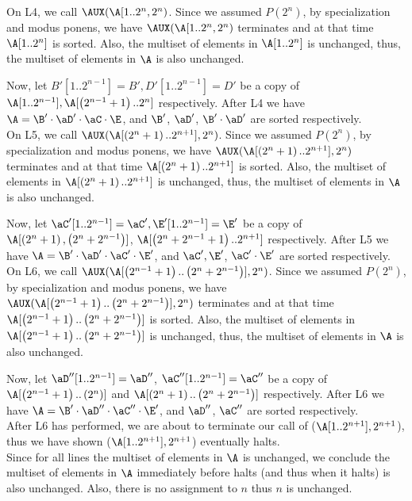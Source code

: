 \documentclass[11pt, sakura, night, 1in]{hw}
\begin{document}
{{{            On L4, we call $\AUX(\A[1..2^n, 2^n)$. Since we assumed $P(2^n)$, by specialization and modus ponens, we have $\AUX(\A[1..2^n, 2^n)$ terminates and at that time $\A[1..2^n]$ is sorted. Also, the multiset of elements in $\A[1..2^n]$ is unchanged, thus, the multiset of elements in $\A$ is also unchanged.

            Now, let $B'[1..2^{n-1}]=B', D'[1..2^{n-1}]=D'$ be a copy of $\A[1..2^{n-1}], \A[\bra{2^{n-1}+1}..2^n]$ respectively. After L4 we have $\A=\B'\cd\aD'\cd\aC\cd\E$, and $\B'$, $\aD'$, $\B'\cd\aD'$ are sorted respectively.\\

            On L5, we call $\AUX(\A[\bra{2^n+1}..2^{n+1}], 2^n)$. Since we assumed $P(2^n)$, by specialization and modus ponens, we have $\AUX(\A[\bra{2^n+1}..2^{n+1}], 2^n)$ terminates and at that time $\A[\bra{2^n+1}..2^{n+1}]$ is sorted. Also, the multiset of elements in $\A[\bra{2^n+1}..2^{n+1}]$ is unchanged, thus, the multiset of elements in $\A$ is also unchanged.

            Now, let $\aC'[1..2^{n-1}]=\aC', \E'[1..2^{n-1}]=\E'$ be a copy of $\A[\bra{2^n+1},\bra{2^n+2^{n-1}}]$, $\A[\bra{2^n+2^{n-1}+1}..2^{n+1}]$ respectively. After L5 we have $\A=\B'\cd\aD'\cd\aC'\cd\E'$, and $\aC', \E'$, $\aC'\cd\E'$ are sorted respectively.\\

            On L6, we call $\AUX(\A[\bra{2^{n-1}+1}..\bra{2^n+2^{n-1}}], 2^n)$. Since we assumed $P(2^n)$, by specialization and modus ponens, we have $\AUX(\A[\bra{2^{n-1}+1}..\bra{2^n+2^{n-1}}], 2^n)$ terminates and at that time $\A[\bra{2^{n-1}+1}..\bra{2^n+2^{n-1}}]$ is sorted. Also, the multiset of elements in $\A[\bra{2^{n-1}+1}..\bra{2^n+2^{n-1}}]$ is unchanged, thus, the multiset of elements in $\A$ is also unchanged.

            Now, let $\aD''[1..2^{n-1}]=\aD''$, $\aC''[1..2^{n-1}]=\aC''$ be a copy of $\A[\bra{2^{n-1}+1}..\bra{2^n}]$ and $\A[\bra{2^n+1}..\bra{2^n+2^{n-1}}]$ respectively. After L6 we have $\A=\B'\cd\aD''\cd\aC''\cd\E'$, and $\aD''$, $\aC''$ are sorted respectively.\\

            After L6 has performed, we are about to terminate our call of \AUX($\A[1..2^{n+1}], 2^{n+1}$), thus we have shown \AUX($\A[1..2^{n+1}], 2^{n+1}$) eventually halts.\\

            Since for all lines the multiset of elements in $\A$ is unchanged, we conclude the multiset of elements in $\A$ immediately before halts (and thus when it halts) is also unchanged. Also, there is no assignment to $n$ thus $n$ is unchanged.\\

}}}
\end{document}
